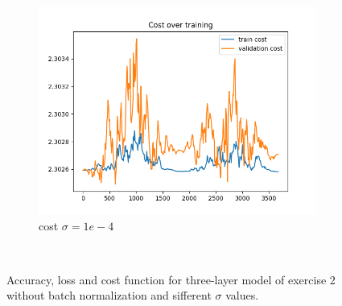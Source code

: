\documentclass[a4paper]{article}
\begin{document}
\begin{figure}[h]
\begin{subfigure}{0.3\textwidth}
		\includegraphics[width=\linewidth]{images/sens_sigma_0.0001_use_bn_False_cost.png}
		\caption{cost $\sigma=1e-4$}
	\end{subfigure} \\

	\caption{Accuracy, loss and cost function for three-layer model of exercise 2 without batch normalization and sifferent $\sigma$ values.}
	\label{fig:sens_no_bn}
\end{figure}
\end{document}
